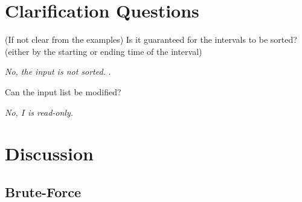 \section{Clarification Questions}

\begin{QandA}
	\begin{questionitem} \begin{question} (If not clear from the examples) Is it guaranteed for the intervals to be sorted? (either by the starting or ending time of the interval) \end{question} 	 
    \begin{answered}
		\textit{No, the input is not sorted. }.
	\end{answered} \end{questionitem}

	\begin{questionitem} \begin{question} Can the input list be modified?\end{question} 	 
    \begin{answered}
		\textit{No, $I$ is read-only.}
	\end{answered} \end{questionitem}
\end{QandA}


\section{Discussion}
\label{example:merge_intervals_2:discussion_1}

\subsection{Brute-Force}
\label{example:merge_intervals_2:bruteforce_1}







